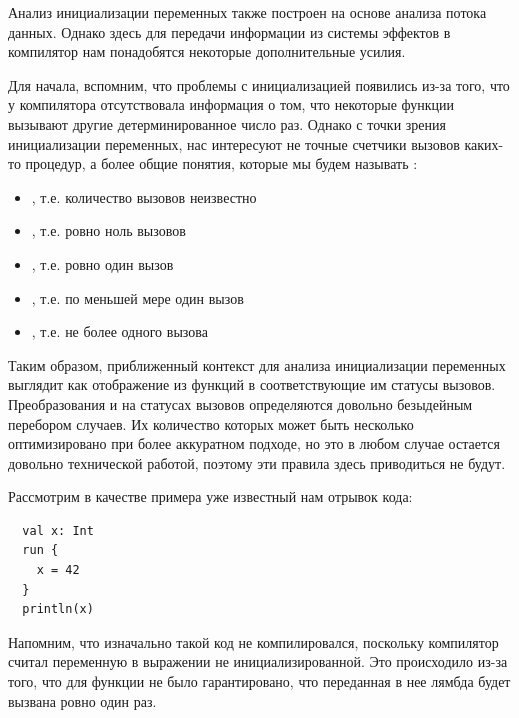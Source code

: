Анализ инициализации переменных также построен на основе анализа потока данных. Однако здесь для передачи информации из системы эффектов в компилятор нам понадобятся некоторые дополнительные усилия.

Для начала, вспомним, что проблемы с инициализацией появились из-за того, что у компилятора отсутствовала информация о том, что некоторые функции вызывают другие детерминированное число раз. Однако с точки зрения инициализации переменных, нас интересуют не точные счетчики вызовов каких-то процедур, а более общие понятия, которые мы будем называть :

\begin{itemize}
  \item {}, т.е. количество вызовов неизвестно

  \item {}, т.е. ровно ноль вызовов

  \item {}, т.е. ровно один вызов

  \item {}, т.е. по меньшей мере один вызов

  \item {}, т.е. не более одного вызова
\end{itemize}

Таким образом, приближенный контекст для анализа инициализации переменных выглядит как отображение из функций в соответствующие им статусы вызовов. Преобразования  и  на статусах вызовов определяются довольно безыдейным перебором случаев. Их количество которых может быть несколько оптимизировано при более аккуратном подходе, но это в любом случае остается довольно технической работой, поэтому эти правила здесь приводиться не будут.

Рассмотрим в качестве примера уже известный нам отрывок кода:

\begin{verbatim}
  val x: Int
  run {
    x = 42
  }
  println(x)
\end{verbatim}

Напомним, что изначально такой код не компилировался, поскольку компилятор считал переменную  в выражении  не инициализированной. Это происходило из-за того, что для функции  не было гарантировано, что переданная в нее лямбда  будет вызвана ровно один раз.

